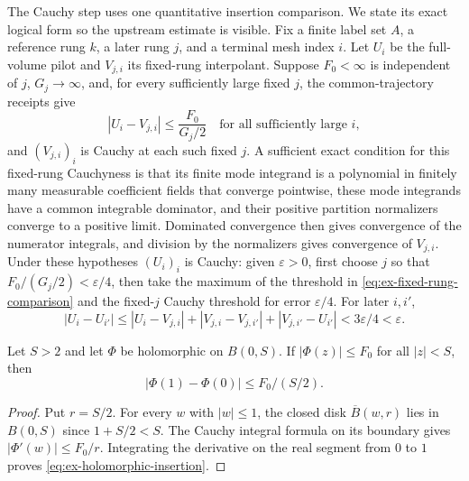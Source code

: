 The Cauchy step uses one quantitative insertion comparison. We state its
exact logical form so the upstream estimate is visible. Fix a finite label
set $A$, a reference rung $k$, a later rung $j$, and a terminal mesh index
$i$. Let $U_i$ be the full-volume pilot and $V_{j,i}$ its fixed-rung
interpolant. Suppose $F_0<\infty$ is independent of $j$, $G_j\to\infty$,
and, for every sufficiently large fixed $j$, the common-trajectory receipts give
\begin{equation}
 |U_i-V_{j,i}|\leq \frac{F_0}{G_j/2}
 \quad\text{for all sufficiently large }i,
 \label{eq:ex-fixed-rung-comparison}
\end{equation}
and $(V_{j,i})_i$ is Cauchy at each such fixed $j$. A sufficient exact
condition for this fixed-rung Cauchyness is that its finite mode integrand is
a polynomial in finitely many measurable coefficient fields that converge
pointwise, these mode integrands have a common integrable dominator, and
their positive partition normalizers converge to a positive limit. Dominated
convergence then gives convergence of the numerator integrals, and division
by the normalizers gives convergence of $V_{j,i}$. Under these hypotheses
$(U_i)_i$ is Cauchy: given $\varepsilon>0$, first choose $j$ so that
$F_0/(G_j/2)<\varepsilon/4$, then take the maximum of the threshold in
\eqref{eq:ex-fixed-rung-comparison} and the fixed-$j$ Cauchy threshold for
error $\varepsilon/4$. For later $i,i'$,
\[
 |U_i-U_{i'}|
 \leq |U_i-V_{j,i}|+|V_{j,i}-V_{j,i'}|+|V_{j,i'}-U_{i'}|
 <3\varepsilon/4<\varepsilon.
\]

\begin{lemma}
\label{lem:ex-holomorphic-insertion}
Let $S>2$ and let $\Phi$ be holomorphic on $B(0,S)$. If
$|\Phi(z)|\leq F_0$ for all $|z|<S$, then
\begin{equation}
 |\Phi(1)-\Phi(0)|\leq F_0/(S/2).
 \label{eq:ex-holomorphic-insertion}
\end{equation}
\end{lemma}
\begin{proof}
Put $r=S/2$. For every $w$ with $|w|\leq1$, the closed disk
$\overline B(w,r)$ lies in $B(0,S)$ since $1+S/2<S$. The Cauchy integral
formula on its boundary gives $|\Phi'(w)|\leq F_0/r$. Integrating
the derivative on the real segment from $0$ to $1$ proves \eqref{eq:ex-holomorphic-insertion}.
\end{proof}

